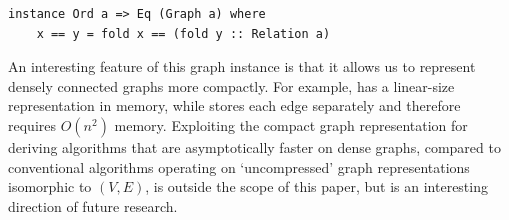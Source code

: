 \begin{verbatim}
instance Ord a => Eq (Graph a) where
    x == y = fold x == (fold y :: Relation a)
\end{verbatim}

An interesting feature of this graph instance is that it allows us to represent
densely connected graphs more compactly. For example, 
has a linear-size representation in memory, while 
stores each edge separately and therefore requires $O(n^2)$ memory. Exploiting the
compact graph representation for deriving algorithms that are asymptotically faster
on dense graphs, compared to conventional algorithms operating on `uncompressed'
graph representations isomorphic to $(V,E)$, is outside the scope of this paper,
but is an interesting direction of future research.




